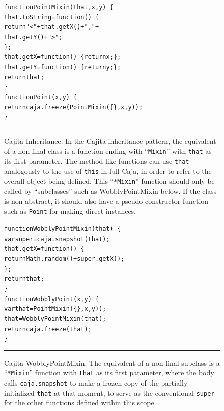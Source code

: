 \documentclass[letterpaper,twocolumn,10pt]{article}
\newcommand{\code}[1]{{\tt {#1}}}              %
\begin{document}
\begin{figure}[t!]
\begin{alltt}
function PointMixin(that, x, y)\ \{
  that.toString = function()\ \{ 
    return "<" + that.getX() + "," + 
                 that.getY() + ">"; 
  \};
  that.getX = function()\ \{ return x; \};
  that.getY = function()\ \{ return y; \};
  return that;
\}
function Point(x, y)\ \{
  return caja.freeze(PointMixin(\{\}, x, y));
\}
\end{alltt}

\caption[Cajita Inheritance.]{Cajita Inheritance. In the Cajita inheritance 
pattern, the equivalent of a non-final class is a function ending with 
``\code{Mixin}'' with \code{that} as its first parameter. The method-like 
functions can use \code{that} analogously to the use of \code{this} in full 
Caja, in order to refer to the overall object being defined. This 
``\code{*Mixin}'' function should only be called by ``subclasses'' such as 
WobblyPointMixin below. If the class is non-abstract, it should also have a 
pseudo-constructor function such as \code{Point} for making direct 
instances. \\ } \hrule
\label{fig:cajita-super-point}
\end{figure}

\begin{figure}[t!]
\begin{alltt}
function WobblyPointMixin(that)\ \{
  var super = caja.snapshot(that);
  that.getX = function()\ \{ 
    return Math.random() + super.getX(); 
  \};
  return that;
\}
function WobblyPoint(x, y)\ \{
  var that = PointMixin(\{\}, x, y));
  that = WobblyPointMixin(that);
  return caja.freeze(that);
\}
\end{alltt}

\caption[Cajita WobblyPointMixin.]{Cajita WobblyPointMixin. The equivalent of 
a non-final subclass is a ``\code{*Mixin}'' function with \code{that} as its 
first parameter, where the body calls \code{caja.snapshot} to make a frozen 
copy of the partially initialized \code{that} at that moment, to serve as the 
conventional \code{super} for the other functions defined within this scope. 
\\ } \hrule
\label{fig:cajita-super-wobbly-point} 
\end{figure}
\end{document}
